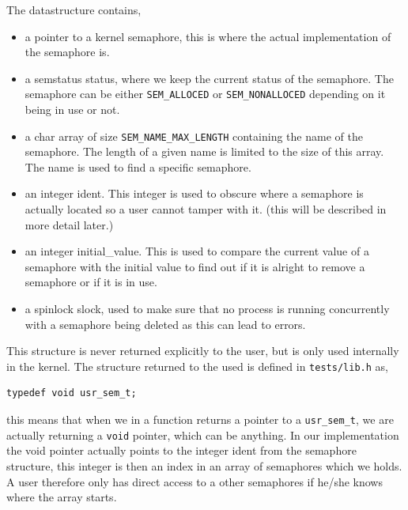 \documentclass[11pt]{article}
\begin{document}
    The datastructure contains,

    \begin{itemize}
        \item a pointer to a kernel semaphore, this is where the actual
            implementation of the semaphore is.
        \item a semstatus status, where we keep the current status of the
            semaphore.  The semaphore can be either \texttt{SEM\_ALLOCED} or
            \texttt{SEM\_NONALLOCED} depending on it being in use or not.
        \item a char array of size \texttt{SEM\_NAME\_MAX\_LENGTH} containing the
            name of the semaphore.  The length of a given name is limited to
            the size of this array.  The name is used to find a specific
            semaphore.
        \item an integer ident.  This integer is used to obscure where a
            semaphore is actually located so a user cannot tamper with it. (this
            will be described in more detail later.)
        \item an integer initial\_value.  This is used to compare the current
            value of a semaphore with the initial value to find out if it is
            alright to remove a semaphore or if it is in use.
        \item a spinlock slock, used to make sure that no process is running
            concurrently with a semaphore being deleted as this can lead to
            errors.
    \end{itemize}

    This structure is never returned explicitly to the user, but is only used
    internally in the kernel.  The structure returned to the used is defined in
    \texttt{tests/lib.h} as,

    \begin{lstlisting}[style=customc]
typedef void usr_sem_t;
    \end{lstlisting}

    this means that when we in a function returns a pointer to a
    \texttt{usr\_sem\_t}, we are actually returning a \texttt{void} pointer,
    which can be anything.  In our implementation the void pointer actually
    points to the integer ident from the semaphore structure, this integer is
    then an index in an array of semaphores which we holds.  A user therefore
    only has direct access to a other semaphores if he/she knows where the array
    starts.
\end{document}
